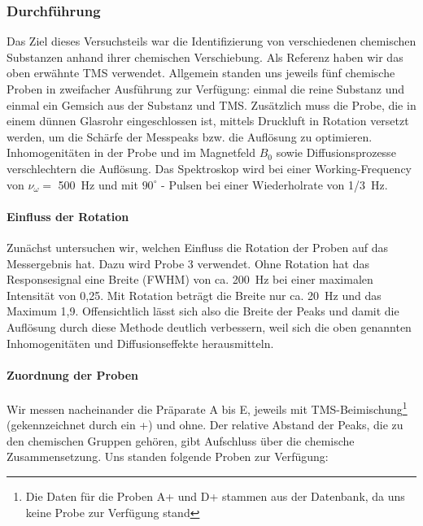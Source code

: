 \documentclass[a4paper]{scrartcl} %
\begin{document}
\subsubsection{Durchführung}

Das Ziel dieses Versuchsteils war die Identifizierung von verschiedenen chemischen Substanzen anhand ihrer chemischen Verschiebung. Als Referenz haben wir das oben erwähnte TMS verwendet. Allgemein standen uns jeweils fünf chemische Proben in zweifacher Ausführung zur Verfügung: einmal die reine Substanz und einmal ein Gemsich aus der Substanz und TMS. Zusätzlich muss die Probe, die in einem dünnen Glasrohr eingeschlossen ist, mittels Druckluft in Rotation versetzt werden, um die Schärfe der Messpeaks bzw. die Auflösung zu optimieren. Inhomogenitäten in der Probe und im Magnetfeld $B_0$ sowie Diffusionsprozesse verschlechtern die Auflösung. Das Spektroskop wird bei einer Working-Frequency von $\nu_{\omega} = $ \SI{500}{Hz} und mit $90^{\circ}$ - Pulsen bei einer Wiederholrate von \SI{1/3}{Hz}.

\paragraph{Einfluss der Rotation}

Zunächst untersuchen wir, welchen Einfluss die Rotation der Proben auf das Messergebnis hat. Dazu wird Probe 3 verwendet. Ohne Rotation hat das Responsesignal eine Breite (FWHM) von ca. \SI{200}{Hz} bei einer maximalen Intensität von 0,25. Mit Rotation beträgt die Breite nur ca. \SI{20}{Hz} und das Maximum 1,9. Offensichtlich lässt sich also die Breite der Peaks und damit die Auflösung durch diese Methode deutlich verbessern, weil sich die oben genannten Inhomogenitäten und Diffusionseffekte herausmitteln.

\paragraph{Zuordnung der Proben}
Wir messen nacheinander die Präparate A bis E, jeweils mit TMS-Beimischung\footnote{Die Daten für die Proben A+ und D+ stammen aus der Datenbank, da uns keine Probe zur Verfügung stand} (gekennzeichnet durch ein +) und ohne. Der relative Abstand der Peaks, die zu den chemischen Gruppen gehören, gibt Aufschluss über die chemische Zusammensetzung. Uns standen folgende Proben zur Verfügung:
\end{document}
